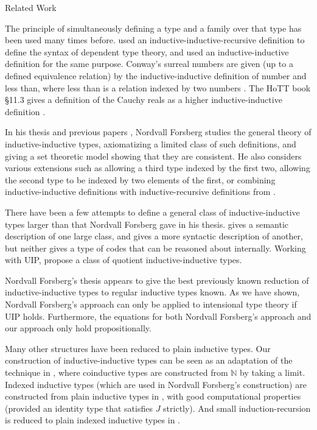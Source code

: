 \documentclass[runningheads]{llncs}
\newcommand{\N}{\mathbb{N}}
\def\Forsberg/{Nordvall Forsberg}
\begin{document}
\begin{section}{Related Work}

The principle of simultaneously defining a type and a family over that type has been used many times before. \citet{danielssonIRdeptype} used an inductive-inductive-recursive definition to define the syntax of dependent type theory, and \citet{CHAPMAN200921} used an inductive-inductive definition for the same purpose. Conway's surreal numbers are given (up to a defined equivalence relation) by the inductive-inductive definition of number and less than, where less than is a relation indexed by two numbers \citep{conway2000numbers}. The HoTT book \S11.3 gives a definition of the Cauchy reals as a higher inductive-inductive definition \citep{hottbook}.

In his thesis and previous papers \citep{nordvallforsberg2013thesis,nordvallforsbergSetzer2010inductiveinductive,nordvallforsbergSetzer2012finIndind}, \Forsberg/ studies the general theory of inductive-inductive types, axiomatizing a limited class of such definitions, and giving a set theoretic model showing that they are consistent. He also considers various extensions such as allowing a third type indexed by the first two, allowing the second type to be indexed by two elements of the first, or combining inductive-inductive definitions with inductive-recursive definitions from \citet{finiteaxiomatizationIR}.

There have been a few attempts to define a general class of inductive-inductive types larger than that \Forsberg/ gave in his thesis. \citet{Altenkirch2016QuotientIT} gives a semantic description of one large class, and \citet{KaposiKovacsHIITsyntax} gives a more syntactic description of another, but neither gives a type of codes that can be reasoned about internally. Working with UIP, \citet{AltenkirchKaposiKovacsConstructingQIITs} propose a class of quotient inductive-inductive types.

\Forsberg/'s thesis \citep{nordvallforsberg2013thesis} appears to give the best previously known reduction of inductive-inductive types to regular inductive types known. As we have shown, \Forsberg/'s approach can only be applied to intensional type theory if UIP holds. Furthermore, the equations for both \Forsberg/'s approach and our approach only hold propositionally.

Many other structures have been reduced to plain inductive types. Our construction of inductive-inductive types can be seen as an adaptation of the technique in \citet{nonwellfoundedtrees}, where coinductive types are constructed from $\N$ by taking a limit. Indexed inductive types (which are used in \Forsberg/'s construction) are constructed from plain inductive types in \citet{altenkirch2015indexed}, with good computational properties (provided an identity type that satisfies $J$ strictly). And small induction-recursion is reduced to plain indexed inductive types in \citet{alti:tlca13-small-ir}.

\end{section}
\end{document}
